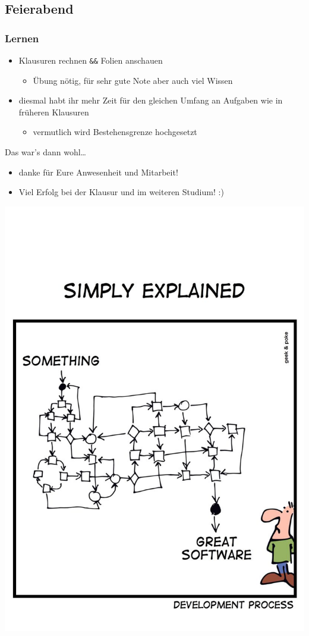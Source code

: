 \documentclass[18pt]{beamer}
\begin{document}
	\subsection{Feierabend}
	\begin{frame}
		\frametitle{Lernen}
		\begin{itemize}
			\item Klausuren rechnen \texttt{\&\&} Folien anschauen
			\begin{itemize}
				\item Übung nötig, für sehr gute Note aber auch viel Wissen
			\end{itemize}
		\pause
			\item diesmal habt ihr mehr Zeit für den gleichen Umfang an Aufgaben wie in früheren Klausuren
			\begin{itemize}
				\item vermutlich wird Bestehensgrenze hochgesetzt
			\end{itemize}
		\end{itemize}
	\end{frame}

	\begin{frame}{Das war's dann wohl\dots}
		\begin{itemize}
			\item danke für Eure Anwesenheit und Mitarbeit!
			\item Viel Erfolg bei der Klausur und im weiteren Studium! :)
		\end{itemize}
	\end{frame}

	\begin{frame}
		\centering

		\includegraphics[scale=0.9]{./comics/geek_and_poke_development2.jpg}
	\end{frame}
\end{document}
